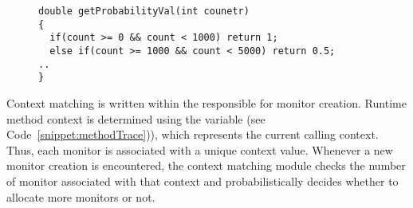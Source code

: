 \begin{figure}[h]
\begin{lstlisting}
double getProbabilityVal(int counetr)
{
  if(count >= 0 && count < 1000) return 1;
  else if(count >= 1000 && count < 5000) return 0.5;
..
}
\end{lstlisting}
\end{figure}

 Context matching is written within the 
 responsible for monitor creation. Runtime method context is 
determined using the  variable (see 
Code~\ref{snippet:methodTrace})), which represents the current calling context. 
Thus, each monitor is associated with a unique context value. Whenever a new 
monitor creation  is encountered, the context matching module 
checks the number of monitor associated with that context and probabilistically 
decides whether to allocate more monitors or not.

